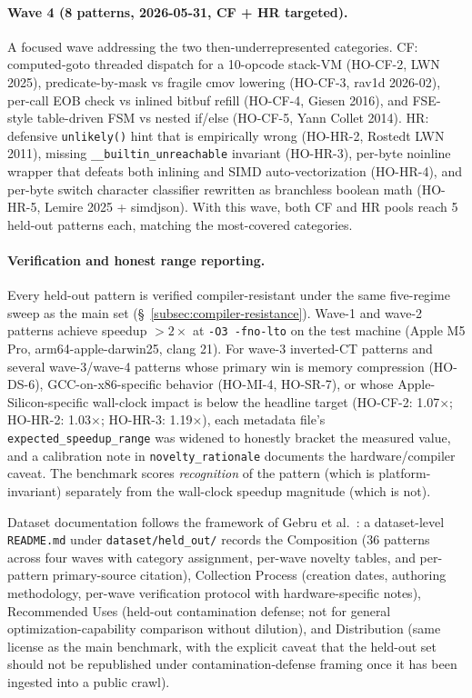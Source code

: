 \paragraph{Wave 4 (8 patterns, 2026-05-31, CF + HR targeted).} A focused wave addressing the two then-underrepresented categories. CF: computed-goto threaded dispatch for a 10-opcode stack-VM (HO-CF-2, LWN 2025), predicate-by-mask vs fragile cmov lowering (HO-CF-3, rav1d 2026-02), per-call EOB check vs inlined bitbuf refill (HO-CF-4, Giesen 2016), and FSE-style table-driven FSM vs nested if/else (HO-CF-5, Yann Collet 2014). HR: defensive \texttt{unlikely()} hint that is empirically wrong (HO-HR-2, Rostedt LWN 2011), missing \texttt{\_\_builtin\_unreachable} invariant (HO-HR-3), per-byte noinline wrapper that defeats both inlining and SIMD auto-vectorization (HO-HR-4), and per-byte switch character classifier rewritten as branchless boolean math (HO-HR-5, Lemire 2025 + simdjson). With this wave, both CF and HR pools reach 5 held-out patterns each, matching the most-covered categories.

\paragraph{Verification and honest range reporting.} Every held-out pattern is verified compiler-resistant under the same five-regime sweep as the main set (\S~\ref{subsec:compiler-resistance}). Wave-1 and wave-2 patterns achieve speedup $>2\times$ at \texttt{-O3 -fno-lto} on the test machine (Apple M5 Pro, arm64-apple-darwin25, clang 21). For wave-3 inverted-CT patterns and several wave-3/wave-4 patterns whose primary win is memory compression (HO-DS-6), GCC-on-x86-specific behavior (HO-MI-4, HO-SR-7), or whose Apple-Silicon-specific wall-clock impact is below the headline target (HO-CF-2: 1.07$\times$; HO-HR-2: 1.03$\times$; HO-HR-3: 1.19$\times$), each metadata file's \texttt{expected\_speedup\_range} was widened to honestly bracket the measured value, and a calibration note in \texttt{novelty\_rationale} documents the hardware/compiler caveat. The benchmark scores \emph{recognition} of the pattern (which is platform-invariant) separately from the wall-clock speedup magnitude (which is not).

Dataset documentation follows the framework of Gebru et al.~\cite{datasheets}: a dataset-level \texttt{README.md} under \texttt{dataset/held\_out/} records the Composition (36 patterns across four waves with category assignment, per-wave novelty tables, and per-pattern primary-source citation), Collection Process (creation dates, authoring methodology, per-wave verification protocol with hardware-specific notes), Recommended Uses (held-out contamination defense; not for general optimization-capability comparison without dilution), and Distribution (same license as the main benchmark, with the explicit caveat that the held-out set should not be republished under contamination-defense framing once it has been ingested into a public crawl).

